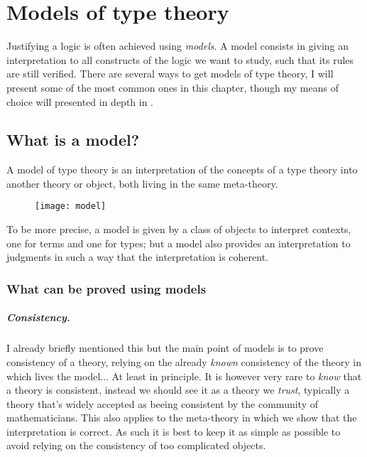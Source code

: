 \chapter{Models of type theory}

Justifying a logic is often achieved using \emph{models}. A model consists
in giving an interpretation to all constructs of the logic we want to study,
such that its rules are still verified.
There are several ways to get models of type theory, I will present some of the
most common ones in this chapter, though my means of choice will presented in
depth in .

\section{What is a model?}

A model of type theory is an interpretation of the concepts of a type theory
into another theory or object, both living in the same meta-theory.
\begin{figure}[hb]
  \texttt{[image: model]}
\end{figure}
To be more precise, a model is given by a class of objects to interpret
contexts, one for terms and one for types; but a model also provides an
interpretation to judgments in such a way that the interpretation is coherent.

\subsection{What can be proved using models}

\paragraph{Consistency.}

I already briefly mentioned this but the main point of models is to prove
consistency of a theory, relying on the already \emph{known} consistency of the
theory in which lives the model... At least in principle. It is however very
rare to \emph{know} that a theory is consistent, instead
we should see it as a theory we \emph{trust}, typically a theory that's widely
accepted as beeing consistent by the community of mathematicians.
This also applies to the meta-theory in which we show that the interpretation is
correct. As such it is best to keep it as simple as possible to avoid relying on
the consistency of too complicated objects.

